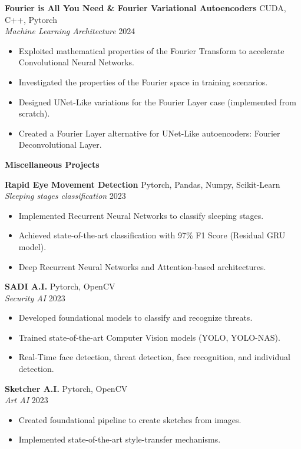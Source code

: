 \documentclass[11pt]{article}
\begin{document}
\textbf{Fourier is All You Need \& Fourier Variational Autoencoders} \hfill CUDA, C++, Pytorch \\
\textit{Machine Learning Architecture} \hfill 2024
\begin{itemize}[noitemsep]
    \item Exploited mathematical properties of the Fourier Transform to accelerate Convolutional Neural Networks.
    \item Investigated the properties of the Fourier space in training scenarios.
    \item Designed UNet-Like variations for the Fourier Layer case \cite{fourier} (implemented from scratch).
    \item Created a Fourier Layer alternative for UNet-Like autoencoders: Fourier Deconvolutional Layer.
\end{itemize}

\begin{center}
    \textbf{Miscellaneous Projects}
\end{center}

\textbf{Rapid Eye Movement Detection} \hfill Pytorch, Pandas, Numpy, Scikit-Learn \\
\textit{Sleeping stages classification} \hfill 2023
\begin{itemize}[noitemsep]
    \item Implemented Recurrent Neural Networks to classify sleeping stages.
    \item Achieved state-of-the-art classification with 97\% F1 Score (Residual GRU model).
    \item Deep Recurrent Neural Networks and Attention-based architectures.
\end{itemize}

\textbf{SADI A.I.} \hfill Pytorch, OpenCV \\
\textit{Security AI} \hfill 2023
\begin{itemize}[noitemsep]
    \item Developed foundational models to classify and recognize threats.
    \item Trained state-of-the-art Computer Vision models (YOLO, YOLO-NAS).
    \item Real-Time face detection, threat detection, face recognition, and individual detection.
\end{itemize}

\textbf{Sketcher A.I.} \hfill Pytorch, OpenCV \\
\textit{Art AI} \hfill 2023
\begin{itemize}[noitemsep]
    \item Created foundational pipeline to create sketches from images.
    \item Implemented state-of-the-art style-transfer mechanisms.
\end{itemize}
\end{document}
